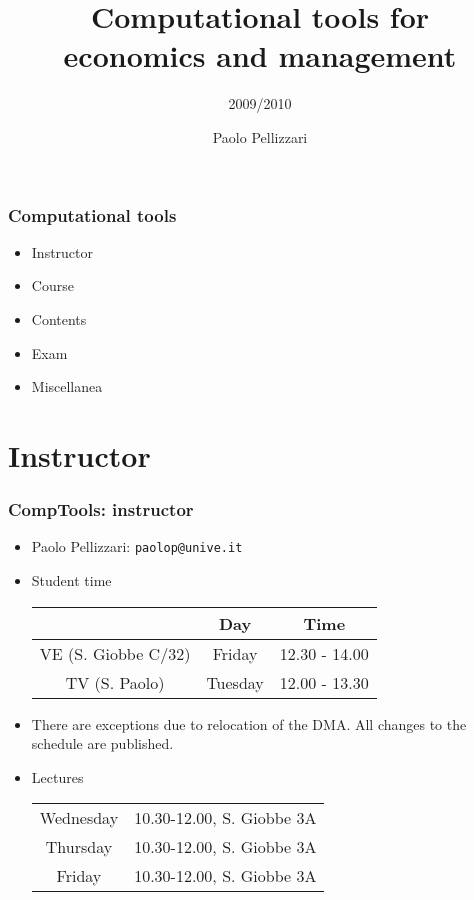 \documentclass[ps,CFframes_inst]{beamer}
\title{Computational tools for \\economics and management}
\subtitle{2009/2010}
\author{Paolo Pellizzari}
\begin{document}
\maketitle

\begin{frame}
    \frametitle{Computational tools}
    \begin{itemize}
        \item Instructor
    
        \item Course
    
        \item Contents
	
	\item Exam
	
	\item Miscellanea
    \end{itemize}
\end{frame}

\section{Instructor}
\begin{frame}
    \frametitle{CompTools: instructor}

\begin{itemize}
	    \item Paolo Pellizzari: \texttt{paolop@unive.it}
	
  	    \item Student time \begin{tabular}{ccc}
  	        
  	         & Day & Time  \\
		 \hline  	        
  	        VE (S. Giobbe C/32) & Friday & 12.30 - 14.00  \\
  	        
  	        TV (S. Paolo) & Tuesday & 12.00 - 13.30
  	    \end{tabular}
	    
	    \item \alert{There are exceptions due to relocation of the
	    DMA}.  All changes to the schedule are published.
	    
	    \item Lectures \medskip
	    
	    \begin{tabular}{c|l}
	        
	        Wednesday & 10.30-12.00, S. Giobbe 3A  \\
	        
	        Thursday & 10.30-12.00, S. Giobbe 3A \\
	        
	        Friday & 10.30-12.00, S. Giobbe 3A \\
	        
	         
	    \end{tabular}
	\end{itemize}
\end{frame}
\end{document}
